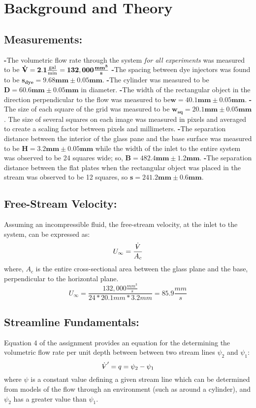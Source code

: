 \documentclass[12pt]{article}
\makeatletter
\DeclareRobustCommand{\volume}{\text{\volumedash}V}
\newcommand{\volumedash}{%
	\makebox[0pt][l]{%
		\ooalign{\hfil\hphantom{$\m@th V$}\hfil\cr\kern0.08em--\hfil\cr}%
	}%
}
\makeatother
\begin{document}
	\section{Background and Theory}
	\hfill\break\break
	\subsection{Measurements:} 
	\hfill\break
	\textbf{-}The volumetric flow rate through the system \textit{for all experiments} was measured to be $\mathbf{\dot{\volume}=2.1 \frac{\textrm{gal}}{\textrm{min}}=132,000 \frac{mm^{3}}{s}}$
	\hfill\break
	\textbf{-}The spacing between dye injectors was found to be $\mathbf{s_{dye}=9.68mm\pm0.05mm}$.
	\hfill\break
	\textbf{-}The cylinder was measured to be $\mathbf{D=60.6mm\pm0.05mm}$ in diameter.
	\hfill\break
	\textbf{-}The width of the rectangular object in the direction perpendicular to the flow was measured to be\hfill\break $\mathbf{w=40.1mm\pm0.05mm}$.
	\hfill\break
	\textbf{-}The size of each square of the grid was measured to be $\mathbf{w_{sq}=20.1mm\pm0.05mm}$. The size of several squares on each image was measured in pixels and averaged to create a scaling factor between pixels and millimeters.
	\hfill\break
	\textbf{-}The separation distance between the interior of the glass pane and the base surface was measured to be $\mathbf{H=3.2mm\pm0.05mm}$ while the width of the inlet to the entire system was observed to be 24 squares wide; so, $\mathbf{B=482.4mm\pm1.2mm}$.
	\hfill\break
	\textbf{-}The separation distance between the flat plates when the rectangular object was placed in the stream was observed to be 12 squares, so  $\mathbf{s=241.2mm\pm0.6mm}$.
	
	\hfill\break\break
	\subsection{Free-Stream Velocity:}
	Assuming an incompressible fluid, the free-stream velocity, at the inlet to the system, can be expressed as:
	$$U_{\infty}=\frac{\dot{\volume}}{A_{c}}$$
	where, ${A_{c}}$ is the entire cross-sectional area between the glass plane and the base, perpendicular to the horizontal plane. \hfill\break
	$$U_{\infty}=\frac{132,000\frac{mm^{3}}{s}}{24*20.1mm * 3.2mm}=85.9\frac{mm}{s}$$
	
	\hfill\break\break
	\subsection{Streamline Fundamentals:}
	Equation 4 of the assignment provides an equation for the determining the volumetric flow rate per unit depth between between two stream lines $\psi_{2}$ and $\psi_{1}$:
	\begin{equation}
	\dot{\volume}'=q=\psi_{2}-\psi_{1}
	\end{equation}
	where $\psi$ is a constant value defining a given stream line which can be determined from models of the flow through an environment (such as around a cylinder), and $\psi_{2}$ has a greater value than $\psi_{1}$.
	
\end{document}

